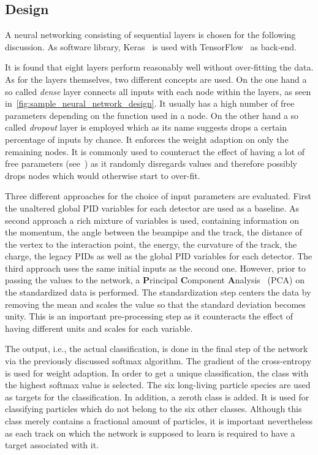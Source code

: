 \subsection{Design}
\label{sec:neural_network_design}

A neural networking consisting of sequential layers is chosen for the following discussion. As software library, Keras~\cite{chollet2015keras} is used with TensorFlow~\cite{tensorflow2015-whitepaper} as back-end.

It is found that eight layers perform reasonably well without over-fitting the data. As for the layers themselves, two different concepts are used. On the one hand a so called \textit{dense} layer connects all inputs with each node within the layers, as seen in~\autoref{fig:sample_neural_network_design}. It usually has a high number of free parameters depending on the function used in a node. On the other hand a so called \textit{dropout} layer is employed which as its name suggests drops a certain percentage of inputs by chance. It enforces the weight adaption on only the remaining nodes. It is commonly used to counteract the effect of having a lot of free parameters (see~\cite{MachineLearning:DeepLearning}) as it randomly disregards values and therefore possibly drops nodes which would otherwise start to over-fit.

Three different approaches for the choice of input parameters are evaluated. First the unaltered global PID variables for each detector are used as a baseline. As second approach a rich mixture of variables is used, containing information on the momentum, the angle between the beampipe and the track, the distance of the vertex to the interaction point, the energy, the curvature of the track, the charge, the legacy PIDs as well as the global PID variables for each detector. The third approach uses the same initial inputs as the second one. However, prior to passing the values to the network, a \textbf{P}rincipal \textbf{C}omponent \textbf{A}nalysis~\cite{BigDataManagementAndAnalytics:TextProcessingAndHigh-DimensionalData} (PCA) on the standardized data is performed. The standardization step centers the data by removing the mean and scales the value so that the standard deviation becomes unity. This is an important pre-processing step as it counteracts the effect of having different units and scales for each variable.

The output, i.e., the actual classification, is done in the final step of the network via the previously discussed softmax algorithm. The gradient of the cross-entropy is used for weight adaption. In order to get a unique classification, the class with the highest softmax value is selected. The six long-living particle species are used as targets for the classification. In addition, a zeroth class is added. It is used for classifying particles which do not belong to the six other classes. Although this class merely contains a fractional amount of particles, it is important nevertheless as each track on which the network is supposed to learn is required to have a target associated with it.

